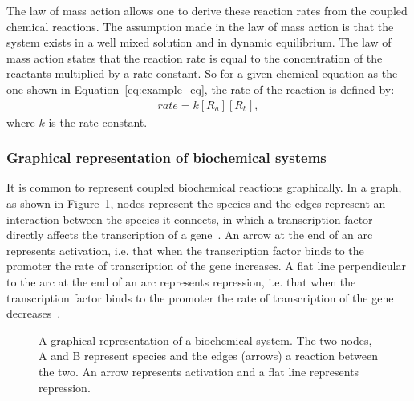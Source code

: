 The law of mass action allows one to derive these reaction rates from the coupled chemical reactions. The assumption made in the law of mass action is that the system exists in a well mixed solution and in dynamic equilibrium. The law of mass action states that the reaction rate is equal to the concentration of the reactants multiplied by a rate constant. So for a given chemical equation as the one shown in Equation~\ref{eq:example_eq}, the rate of the reaction is defined by:
\begin{align*}
	rate = k[R_a][R_b],
\end{align*}
\noindent where $k$ is the rate constant.


\subsubsection{Graphical representation of biochemical systems}

It is common to represent coupled biochemical reactions graphically. In a graph, as shown in Figure~\ref{fig:Toggle_switch_example}, nodes represent the species and the edges represent an interaction between the species it connects, in which a transcription factor directly affects the transcription of a gene~\autocite{Alon:2007}. An arrow at the end of an arc represents activation, i.e. that when the transcription factor binds to the promoter the rate of transcription of the gene increases. A flat line perpendicular to the arc at the end of an arc represents repression, i.e. that when the transcription factor binds to the promoter the rate of transcription of the gene decreases~\autocite{Alon:2007}.

\begin{figure}[h!]
\begin{center}
\caption[A graphical representation of a biochemical system]{A graphical representation of a biochemical system. The two nodes, A and B represent species and the edges (arrows) a reaction between the two. An arrow represents activation and a flat line represents repression.}
\label{fig:Toggle_switch_example}
\end{center}

\end{figure}	



